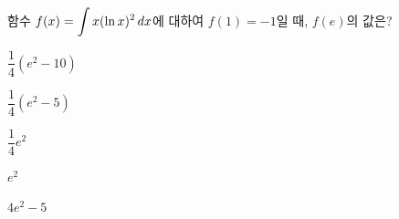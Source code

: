 \hspace*{2mm}\begin{minipage}[t]{\dimexpr\linewidth-2mm\relax}\vspace{0pt}
함수 $f(x)=\displaystyle\int x(\ln x)^2\mkern3mu dx$에 대하여 $f(1)=-1$일 때, $f(e)$의 값은?
\begin{choices32}{\rule[-3ex]{0pt}{8ex}$\dfrac{1}{4}(e^2-10)$}{\rule[-3ex]{0pt}{8ex}$\dfrac{1}{4}(e^2-5)$}{\rule[-3ex]{0pt}{8ex}$\dfrac{1}{4}e^2$}{\rule[-3ex]{0pt}{8ex}$e^2$}{\rule[-3ex]{0pt}{8ex}$4e^2-5$}\end{choices32}\end{minipage}
